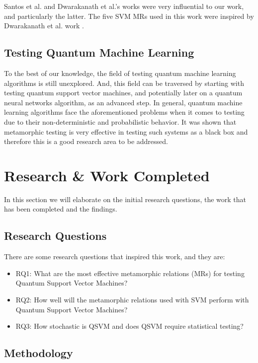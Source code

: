 \documentclass[12pt,a4paper]{article}
\begin{document}
	Santos et al. \cite{ssantos2020} and Dwarakanath et al.'s \cite{Dwarakanath2018} works were very influential to our work, and particularly the latter. The five SVM MRs used in this work were inspired by Dwarakanath et al. work \cite{Dwarakanath2018}.
	
	\subsection{Testing Quantum Machine Learning}
	
	To the best of our knowledge, the field of testing quantum machine learning algorithms is still unexplored. And, this field can be traversed by starting with testing quantum support vector machines, and potentially later on a quantum neural networks algorithm, as an advanced step. In general, quantum machine learning algorithms face the aforementioned problems when it comes to testing due to their non-deterministic and probabilistic behavior. It was shown that metamorphic testing is very effective in testing such systems as a black box and therefore this is a good research area to be addressed.
	
	\section{Research \& Work Completed}
	\label{sec:WorkCompleted}
	In this section we will elaborate on the initial research questions, the work that has been completed and the findings.
	
	\subsection{Research Questions}
	
	There are some research questions that inspired this work, and they are:
	
	\begin{itemize}
		\item RQ1: What are the most effective metamorphic relations (MRs) for testing Quantum Support Vector Machines?
		
		\item RQ2: How well will the metamorphic relations used with SVM perform with Quantum Support Vector Machines?
		
		\item RQ3: How stochastic is QSVM and does QSVM require statistical testing?
	\end{itemize}
	
	\subsection{Methodology}
	
\end{document}
